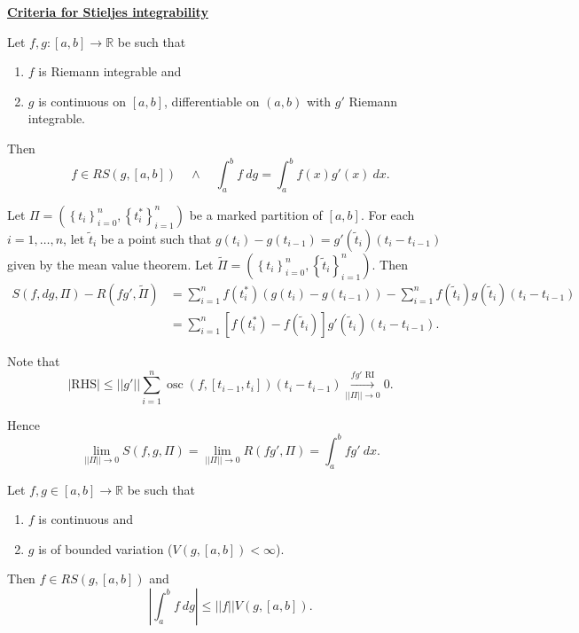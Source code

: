 \documentclass{notes}
\begin{document}
  \newpage
  
  {\boldmath \bfseries \underline{Criteria for Stieljes integrability}}
  
  \begin{thm}
    Let $f, g \colon [a, b] \to \mathbb R$ be such that 
    \begin{enumerate}
      \item $f$ is Riemann integrable and 

      \item $g$ is continuous on $[a, b]$, differentiable on $(a, b)$ with $g'$ Riemann integrable.
    \end{enumerate}
    Then 
    \[
      f \in RS(g, [a, b]) \quad \land \quad \int_a^b f\ dg = \int_a^b f(x) g'(x)\ dx.
    \]
  \end{thm}
  
  \begin{prf}
    Let $\Pi = (\left \{ t_i \right \}_{i = 0}^n, \left \{ t^*_i \right \}_{i = 1}^n)$ be a marked partition of $[a, b]$.
    For each $i = 1, \dots, n$, let $\tilde t_i$ be a point such that $g(t_i) - g(t_{i - 1}) = g'(\tilde t_i) (t_i - t_{i - 1})$ given by the mean value theorem.
    Let $\tilde \Pi = (\left \{ t_i \right \}_{i = 0}^n, \left \{ \tilde t_i \right \}_{i = 1}^n)$.
    Then 
    \begin{align*}
      S(f, dg, \Pi) - R(f g', \tilde \Pi) &= \sum_{i = 1}^n f(t^*_i) (g(t_i) - g(t_{i - 1})) - \sum_{i = 1}^n f(\tilde t_i) g(\tilde t_i) (t_i - t_{i - 1}) \\ 
      &= \sum_{i = 1}^n [f(t^*_i) - f(\tilde t_i)] g'(\tilde t_i) (t_i - t_{i - 1}).
    \end{align*}
    
    Note that 
    \[
      \left | \text{RHS} \right | \leq ||g'|| \sum_{i = 1}^n \operatorname{osc}(f, [t_{i - 1}, t_i]) (t_i - t_{i - 1}) \overset{\text{$f g'$ RI}}{\underset{||\Pi|| \to 0}{\longrightarrow}} 0. 
    \]
    
    Hence 
    \[
      \lim_{||\Pi|| \to 0} S(f, g, \Pi) = \lim_{||\Pi|| \to 0} R(f g', \Pi) = \int_a^b f g'\ dx.
    \]
  \end{prf}
  
  \begin{thm}[BV condition]
    Let $f, g \in [a, b] \to \mathbb R$ be such that 
    \begin{enumerate}
      \item $f$ is continuous and 
      
      \item $g$ is of bounded variation ($V(g, [a, b]) < \infty$).
    \end{enumerate}
    
    Then $f \in RS(g, [a, b])$ and 
    \[
      \left | \int_a^b f\ dg \right | \leq ||f|| V(g, [a, b]).
    \]
  \end{thm}
  
\end{document}
